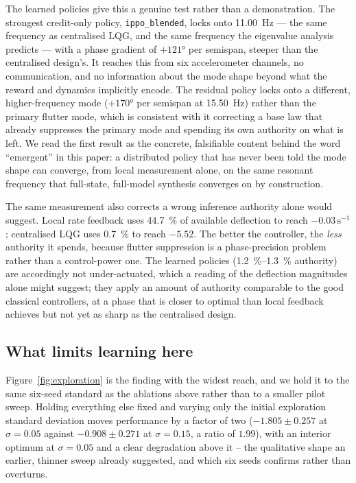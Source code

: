 \documentclass[preprint,11pt,authoryear]{elsarticle}
\begin{document}
The learned policies give this a genuine test rather than a demonstration. The
strongest credit-only policy, \texttt{ippo\_blended}, locks onto
\SI{11.00}{\hertz} --- the same frequency as centralised LQG, and the same
frequency the eigenvalue analysis predicts --- with a phase gradient of
$+121\si{\degree}$ per semispan, steeper than the centralised design's. It
reaches this from six accelerometer channels, no communication, and no
information about the mode shape beyond what the reward and dynamics implicitly
encode. The residual policy locks onto a different, higher-frequency mode
($+170\si{\degree}$ per semispan at \SI{15.50}{\hertz}) rather than the primary
flutter mode, which is consistent with it correcting a base law that already
suppresses the primary mode and spending its own authority on what is left. We
read the first result as the concrete, falsifiable content behind the word
``emergent'' in this paper: a distributed policy that has never been told the
mode shape can converge, from local measurement alone, on the same resonant
frequency that full-state, full-model synthesis converges on by construction.

The same measurement also corrects a wrong inference authority alone would
suggest. Local rate feedback uses \SI{44.7}{\percent} of available deflection to
reach $-0.03\,\mathrm{s}^{-1}$; centralised LQG uses \SI{0.7}{\percent} to reach
$-5.52$. The better the controller, the \emph{less} authority it spends, because
flutter suppression is a phase-precision problem rather than a control-power
one. The learned policies (\SIrange{1.2}{1.3}{\percent} authority) are
accordingly not under-actuated, which a reading of the deflection magnitudes
alone might suggest; they apply an amount of authority comparable to the good
classical controllers, at a phase that is closer to optimal than local feedback
achieves but not yet as sharp as the centralised design.

\subsection{What limits learning here}
\label{sec:exploration}

Figure~\ref{fig:exploration} is the finding with the widest reach, and we hold
it to the same six-seed standard as the ablations above rather than to a
smaller pilot sweep. Holding everything else fixed and varying only the initial exploration standard
deviation moves performance by a factor of two ($-1.805\pm0.257$ at
$\sigma=0.05$ against $-0.908\pm0.271$ at $\sigma=0.15$, a ratio of $1.99$),
with an interior optimum at $\sigma=0.05$ and a clear degradation above it --
the qualitative shape an earlier, thinner sweep already suggested, and which
six seeds confirms rather than overturns.
\end{document}
